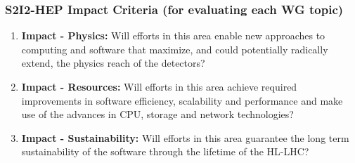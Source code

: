 \begin{frame}
\frametitle{S2I2-HEP Impact Criteria (for evaluating each WG topic)}

\begin{enumerate}
\item {\bf Impact - Physics:} Will efforts in this area enable new approaches to computing and software that maximize, and could potentially radically extend, the physics reach of the detectors?
\item {\bf Impact - Resources:} Will efforts in this area achieve required improvements in software efficiency, scalability and performance and make use of the advances in CPU, storage and network technologies?
\item {\bf Impact - Sustainability:} Will efforts in this area guarantee the long term sustainability of the software through the lifetime of the HL-LHC?
\end{enumerate}
\end{frame}


